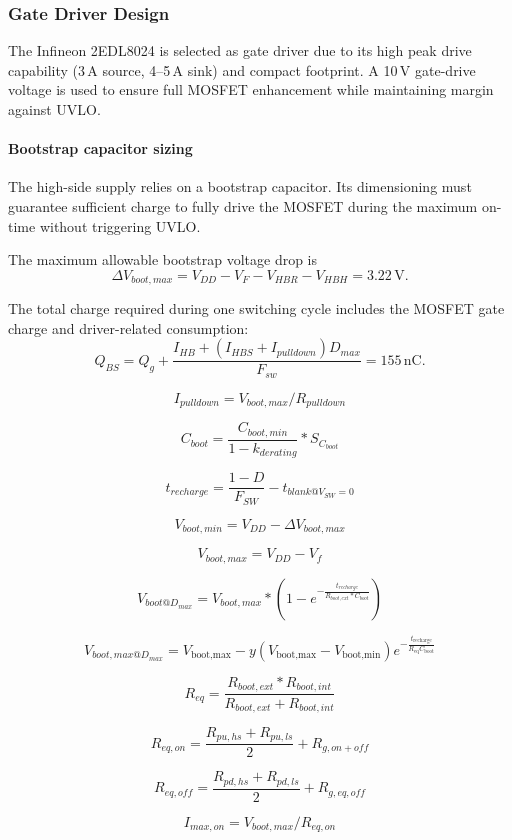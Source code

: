 \documentclass[a4paper, 10pt, conference]{IEEEtran} %
\begin{document}
\subsubsection*{Gate Driver Design}

The Infineon 2EDL8024 is selected as gate driver due to its high peak drive capability (3\,A source, 4–5\,A sink) and compact footprint. A 10\,V gate-drive voltage is used to ensure full MOSFET enhancement while maintaining margin against UVLO.

\paragraph{Bootstrap capacitor sizing}

The high-side supply relies on a bootstrap capacitor. Its dimensioning must guarantee sufficient charge to fully drive the MOSFET during the maximum on-time without triggering UVLO.

The maximum allowable bootstrap voltage drop is
\[
\Delta V_{boot,max} = V_{DD} - V_F - V_{HBR} - V_{HBH} = 3.22\,\text{V}.
\]

The total charge required during one switching cycle includes the MOSFET gate charge and driver-related consumption:
\[
Q_{BS} = Q_g + \frac{I_{HB} + (I_{HBS} + I_{pulldown}) D_{max}}{F_{sw}} = 155\,\text{nC}.
\]

\[
I_{pulldown} = V_{boot,max} / R_{pulldown}
\]

\[
C_{boot} = \frac{C_{boot,min}}{1-{k_{derating}}}*S_{C_{boot}}
\]

\[
t_{recharge} = \frac{1-D}{F_{SW}} - t_{blank@V_{SW}=0}
\]

\[
V_{boot,min} = V_{DD}-\Delta V_{boot,max}
\]

\[
V_{boot,max} = V_{DD}-V_f
\]

\[
V_{boot@D_{max}} = V_{boot,max}*(1-e^{-\frac{t_{recharge}}{R_{boot,ext}*C_{boot}}})
\]

\[
V_{boot,max @ D_{max}} = V_{\text{boot,max}} - y\left(V_{\text{boot,max}} - V_{\text{boot,min}}\right)
e^{-\frac{t_{\text{recharge}}}{R_{\text{eq}}C_{\text{boot}}}}
\]

\[
R_{eq} = \frac{  R_{boot,ext} * R_{boot,int}   }{    R_{boot,ext} + R_{boot,int} }
\]

\[
R_{eq,on} = \frac{R_{pu,hs}+R_{pu,ls}}{2} + R_{g,on+off}
\]

\[
R_{eq,off} = \frac{R_{pd,hs}+R_{pd,ls}}{2} + R_{g,eq,off}
\]

\[
I_{max,on} = V_{boot,max} / R_{eq,on}
\]
\end{document}
